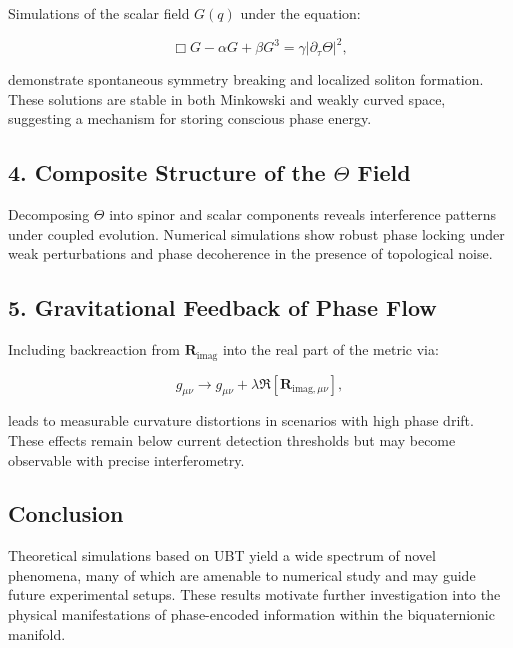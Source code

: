Simulations of the scalar field \(G(q)\) under the equation:

\[
\Box G - \alpha G + \beta G^3 = \gamma |\partial_\tau \Theta|^2,
\]

demonstrate spontaneous symmetry breaking and localized soliton formation. These solutions are stable in both Minkowski and weakly curved space, suggesting a mechanism for storing conscious phase energy.

\subsection*{4. Composite Structure of the \(\Theta\) Field}

Decomposing \(\Theta\) into spinor and scalar components reveals interference patterns under coupled evolution. Numerical simulations show robust phase locking under weak perturbations and phase decoherence in the presence of topological noise.

\subsection*{5. Gravitational Feedback of Phase Flow}

Including backreaction from \(\mathbf{R}_{\text{imag}}\) into the real part of the metric via:

\[
g_{\mu\nu} \rightarrow g_{\mu\nu} + \lambda \Re[\mathbf{R}_{\text{imag}, \mu\nu}],
\]

leads to measurable curvature distortions in scenarios with high phase drift. These effects remain below current detection thresholds but may become observable with precise interferometry.

\subsection*{Conclusion}

Theoretical simulations based on UBT yield a wide spectrum of novel phenomena, many of which are amenable to numerical study and may guide future experimental setups. These results motivate further investigation into the physical manifestations of phase-encoded information within the biquaternionic manifold.
